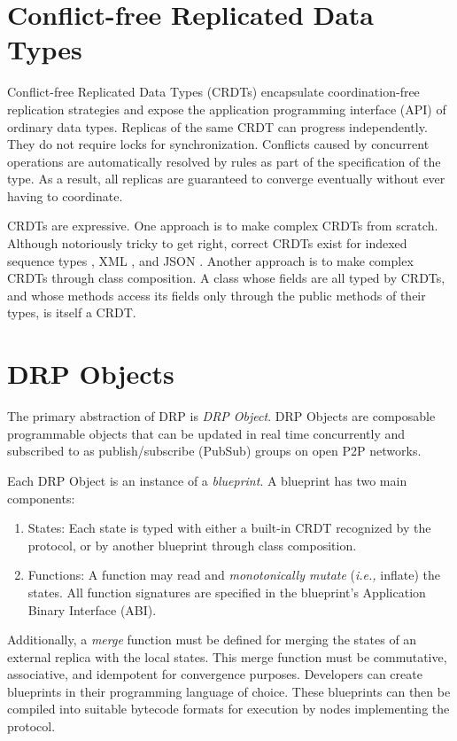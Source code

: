 \documentclass{article}
\begin{document}
\section{Conflict-free Replicated Data Types}
\label{sec:headings}

Conflict-free Replicated Data Types (CRDTs) encapsulate coordination-free replication strategies and expose the application programming interface (API) of ordinary data types. Replicas of the same CRDT can progress independently. They do not require locks for synchronization. Conflicts caused by concurrent operations are automatically resolved by rules as part of the specification of the type. As a result, all replicas are guaranteed to converge eventually without ever having to coordinate.

CRDTs are expressive. One approach is to make complex CRDTs from scratch. Although notoriously tricky to get right, correct CRDTs exist for indexed sequence types \cite{Lseq, RGA, YATA, Fugue}, XML \cite{XML-CRDT}, and JSON \cite{JSON-CRDT}. Another approach is to make complex CRDTs through class composition. A class whose fields are all typed by CRDTs, and whose methods access its fields only through the public methods of their types, is itself a CRDT.

\section{DRP Objects}
\label{sec:headings}

The primary abstraction of DRP is \textit{DRP Object}. DRP Objects are composable programmable objects that can be updated in real time concurrently and subscribed to as publish/subscribe (PubSub) groups on open P2P networks.

Each DRP Object is an instance of a \textit{blueprint}. A blueprint has two main components:
\begin{enumerate}
    \item States: Each state is typed with either a built-in CRDT recognized by the protocol, or by another blueprint through class composition.
    \item Functions: A function may read and \textit{monotonically mutate} (\textit{i.e.,} inflate) the states. All function signatures are specified in the blueprint's Application Binary Interface (ABI).
\end{enumerate}
Additionally, a \textit{merge} function must be defined for merging the states of an external replica with the local states. This merge function must be commutative, associative, and idempotent for convergence purposes. Developers can create blueprints in their programming language of choice. These blueprints can then be compiled into suitable bytecode formats for execution by nodes implementing the protocol.
\end{document}
